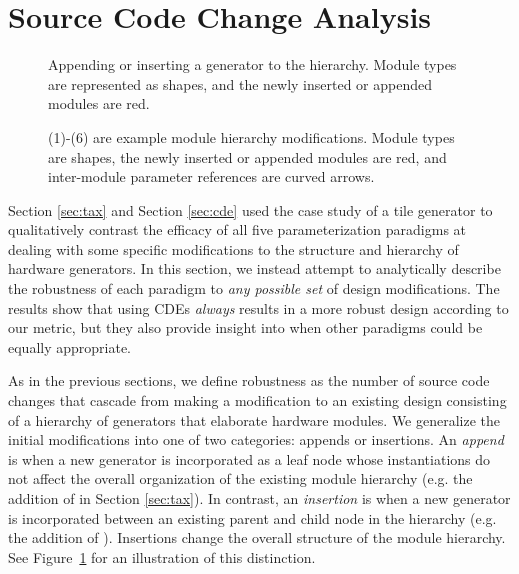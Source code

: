 \section{Source Code Change Analysis}
\label{sec:scca}

\begin{figure}[p]
\centering
{}
\caption[Appending or inserting a generator to the hierarchy.]{Appending or inserting a generator to the hierarchy.
Module types are represented as shapes, and the newly inserted or appended modules are red.}
\label{fig:both}
\end{figure}

\begin{figure}
\centering
{}
\caption[Example classifications of modifications.]{(1)-(6) are example module hierarchy modifications. 
Module types are shapes, the newly inserted or appended modules are red, and inter-module parameter references are curved arrows.}
\label{fig:attr}
\end{figure}

Section \ref{sec:tax} and Section \ref{sec:cde} used the case study of a tile generator to qualitatively contrast the efficacy of all five parameterization paradigms
at dealing with some specific modifications to the structure and hierarchy of hardware generators.
In this section, we instead attempt to analytically describe the robustness of each paradigm to \textit{any possible set} of design modifications.
The results show that using CDEs \textit{always} results in a more robust design according to our metric,
but they also provide insight into when other paradigms could be equally appropriate.

As in the previous sections, we define robustness as the number of source code changes that cascade from making a modification to an existing design
consisting of a hierarchy of generators that elaborate hardware modules.
We generalize the initial modifications into one of two categories: appends or insertions.
An \emph{append} is when a new generator is incorporated as a leaf node whose instantiations do not affect the overall organization of the existing module hierarchy
(e.g. the addition of  in Section \ref{sec:tax}).
In contrast, an \emph{insertion} is when a new generator is incorporated between an existing parent and child node in the hierarchy (e.g. the addition of ). 
Insertions change the overall structure of the module hierarchy.
See Figure~\ref{fig:both} for an illustration of this distinction.


